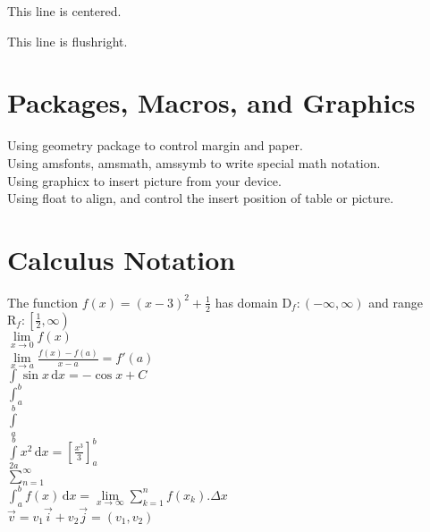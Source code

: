 \documentclass[12pt]{article}
\begin{document}
	\begin{center}
		This line is centered.
	\end{center}

	\begin{flushright}
		This line is flushright.
	\end{flushright}
	
	\section{Packages, Macros, and Graphics}
	
	\leavevmode
	
	Using geometry package to control margin and paper.\\
	
	Using amsfonts, amsmath, amssymb to write special math notation.\\
	
	Using graphicx to insert picture from your device.\\
	
	Using float to align, and control the insert position of table or picture.\\
	
	\section{Calculus Notation}
	
	\leavevmode
	
	The function $f(x) = (x-3)^2+\frac{1}{2}$ has domain $\text{D}_f:(-\infty, \infty)$ and range $\text{R}_f:\left[\frac{1}{2}, \infty\right)$\\
	
	$\lim\limits_{x \to 0} f(x)$\\
	
	$\displaystyle{\lim \limits_{x \to a} \frac{f(x) - f(a)}{x- a} = f'(a)}$\\
	
	$\displaystyle{\int} \sin x \, \text{d}x = -\cos x + C$\\
	
	$\displaystyle{\int_a^b}$\\
	
	$\displaystyle{\int \limits_a^b}$\\
	
	$\displaystyle{\int \limits_{2a}^b} x^2 \, \text{d}x = \left[\frac{x^3}{3}\right]_a^b$\\
	
	$\displaystyle{\sum \limits_{n=1}^{\infty}}$\\
	
	$\displaystyle{\int_a^b f(x) \, \text{d}x = \lim \limits_{x \to \infty} \sum \limits_{k=1}^{n} f(x_k). \Delta x}$\\
	
	$\vec{v} = v_1 \vec{i} + v_2 \vec{j} = (v_1, v_2)$
	
\end{document}
